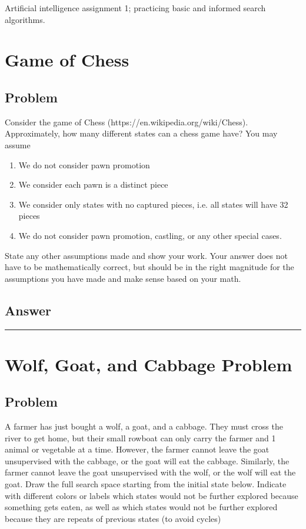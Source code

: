 \documentclass[11pt]{article}
\begin{document}
\begin{flushleft}
Artificial intelligence assignment 1; practicing basic and informed search 
algorithms.

\section*{Game of Chess}

\subsection*{Problem}
Consider the game of Chess (https://en.wikipedia.org/wiki/Chess). Approximately,
how many different states can a chess game have? You may assume

\begin{enumerate}
    \item We do not consider pawn promotion
    \item We consider each pawn is a distinct piece
    \item We consider only states with no captured pieces, i.e. all states will
        have 32 pieces
    \item We do not consider pawn promotion, castling, or any other special
        cases.
\end{enumerate}

State any other assumptions made and show your work. Your answer does not have 
to be mathematically correct, but should be in the right magnitude for the 
assumptions you have made and make sense based on your math.

\subsection*{Answer}

\hspace{1cm}
\hrule
\section*{Wolf, Goat, and Cabbage Problem}

\subsection*{Problem}
A farmer has just bought a wolf, a goat, and a cabbage. They must cross the
river to get home, but their small rowboat can only carry the farmer and 1
animal or vegetable at a time. However, the farmer cannot leave the goat
unsupervised with the cabbage, or the goat will eat the cabbage. Similarly,
the farmer cannot leave the goat unsupervised with the wolf, or the wolf
will eat the goat. Draw the full search space starting from the initial
state below. Indicate with different colors or labels which states would
not be further explored because something gets eaten, as well as which
states would not be further explored because they are repeats of previous
states (to avoid cycles)


\end{flushleft}
\end{document}
